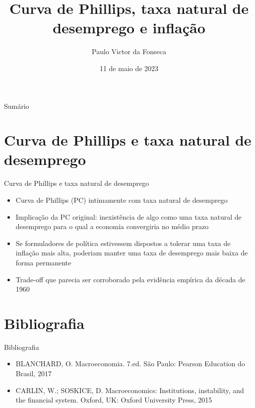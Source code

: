 \documentclass[10pt]{beamer}
\title[]{Curva de Phillips, taxa natural de desemprego e inflação}
\author[]{Paulo Victor da Fonseca}
\date{11 de maio de 2023}
\begin{document}
\begin{frame}[plain]
\end{frame}

\begin{frame}{Sumário}
    \tableofcontents
\end{frame}

\section{Curva de Phillips e taxa natural de desemprego}
\begin{frame}
    {Curva de Phillips e taxa natural de desemprego}
    \begin{itemize}
        \item Curva de Phillips (PC) intimamente com taxa natural de desemprego\bigskip
        \item Implicação da PC original: inexistência de algo como uma taxa natural de desemprego para o qual a economia convergiria no médio prazo\bigskip
        \item Se formuladores de política estivessem dispostos a tolerar uma taxa de inflação mais alta, poderiam manter uma taxa de desemprego mais baixa de forma permanente\bigskip
        \item Trade-off que parecia ser corroborado pela evidência empírica da década de 1960
    \end{itemize}
\end{frame}

\section{Bibliografia}
\begin{frame}{ Bibliografia}
    \begin{itemize}                
        \item BLANCHARD, O. Macroeconomia. 7.ed. São Paulo: Pearson Education do Brasil, 2017\medskip                
        \item CARLIN, W.; SOSKICE, D. Macroeconomics: Institutions, instability, and the financial system. Oxford, UK: Oxford University Press, 2015\medskip        
    \end{itemize}
\end{frame}
\end{document}
